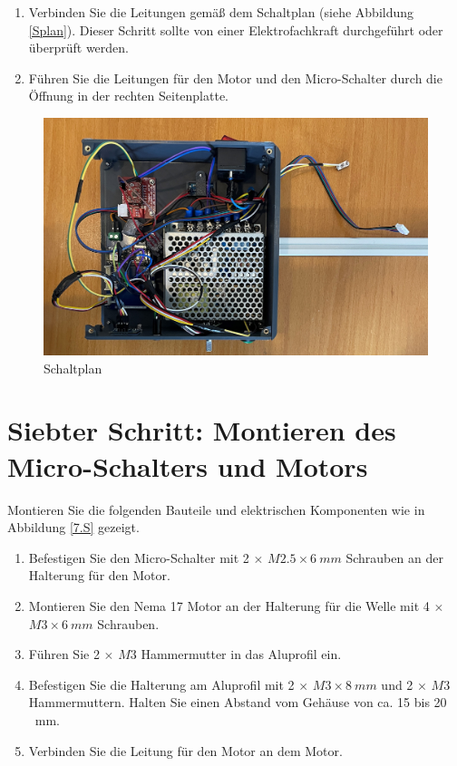 \begin{enumerate}
	\item Verbinden Sie die Leitungen gemäß dem Schaltplan (siehe Abbildung \ref{Splan}). Dieser Schritt sollte von einer Elektrofachkraft durchgeführt oder überprüft werden.
	\item Führen Sie die Leitungen für den Motor und den Micro-Schalter durch die Öffnung in der rechten Seitenplatte.
\end{enumerate}

\begin{figure}[H]
	\begin{center}
		\includegraphics[width=\textwidth]{Images/6Schr.jpg}
		\caption{Schaltplan} \label{6.S}
	\end{center}
\end{figure}


\section{Siebter Schritt: Montieren des Micro-Schalters und Motors}
Montieren Sie die folgenden Bauteile und elektrischen Komponenten wie in Abbildung \ref{7.S} gezeigt.

\begin{enumerate}
	\item Befestigen Sie den Micro-Schalter mit 2 $\times$ $ M2.5 \times 6 \ mm $ Schrauben an der Halterung für den Motor.
	\item Montieren Sie den Nema 17 Motor an der Halterung für die Welle mit 4 $\times$ $ M3 \times 6 \ mm  $ Schrauben.
	\item Führen Sie 2 $\times$ $ M3 $ Hammermutter in das Aluprofil ein.
	\item Befestigen Sie die Halterung am Aluprofil mit 2 $\times$ $ M3 \times 8 \ mm $ und 2 $\times$ $ M3 $ Hammermuttern. Halten Sie einen Abstand vom Gehäuse von ca. 15 bis 20 \ mm. 
	\item Verbinden Sie die Leitung für den Motor an dem Motor. 
\end{enumerate}

